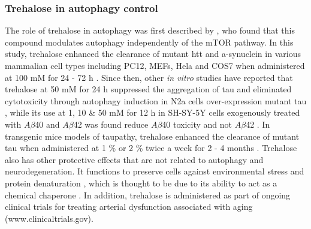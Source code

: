 \subsubsection{Trehalose in autophagy control}
The role of trehalose in autophagy was first described by \citet{Sarkar2007,Sarkar2007a}, who found that this compound modulates autophagy independently of the mTOR pathway. In this study, trehalose enhanced the clearance of mutant htt and a-synuclein in various mammalian cell types including PC12, MEFs, Hela and COS7 when administered at 100 mM for 24 - 72 h \citet{Sarkar2007,Sarkar2007a}. Since then, other \textit{in vitro} studies have reported that trehalose at 50 mM for 24 h suppressed the aggregation of tau and eliminated cytotoxicity through autophagy induction in N2a cells over-expression mutant tau \citep{Kruger2012}, while its use at 1, 10 \& 50 mM for 12 h in SH-SY-5Y cells exogenously treated with $A\beta$40 and $A\beta$42 was found reduce $A\beta$40 toxicity and not $A\beta$42 \citep{Liu2005}. In transgenic mice models of taupathy, trehalose enhanced  the clearance of mutant tau when administered at 1 \% or 2 \% twice a week for 2 - 4 months \citep{Rodriguez-Navarro2010,Schaeffer2012}. Trehalose also has other protective effects that are not related to autophagy and neurodegeneration. It functions to preserve cells against environmental stress and protein denaturation \citep{Chen2004,Gonzalez-Polo2015}, which is thought to be due to its ability to act as a chemical chaperone \citep{Sarkar2007}. In addition, trehalose is administered as part of ongoing clinical trials for treating arterial dysfunction associated with aging (www.clinicaltrials.gov).

